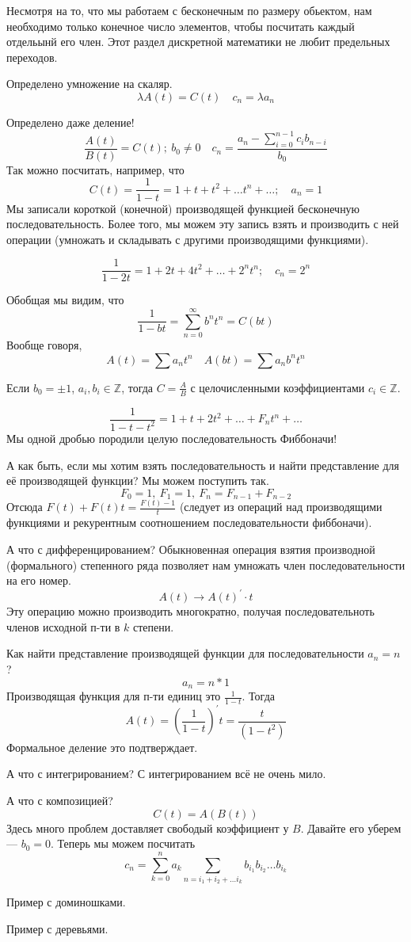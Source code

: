 Несмотря на то, что мы работаем с бесконечным по размеру обьектом, нам необходимо только конечное число элементов, чтобы посчитать каждый отдельынй его член.
Этот раздел дискретной математики не любит предельных переходов.

Определено умножение на скаляр.
\[ \lambda A(t) = C(t) \quad c_n = \lambda a_n\]

Определено даже деление! 
\[ \frac{A(t)}{B(t)} = C(t);\ b_0 \neq 0 \quad c_n = \frac{a_n - \sum_{i=0}^{n-1}c_ib_{n-i}}{b_0} \] 
Так можно посчитать, например, что 
\[C(t) = \frac{1}{1-t} = 1 + t + t^2 + \ldots t^n + \ldots; \quad a_n = 1\]
Мы записали короткой (конечной) производящей функцией бесконечную последовательность. 
Более того, мы можем эту запись взять и производить с ней операции (умножать и складывать с другими производящими функциями).

\[ \frac{1}{1-2t} = 1 + 2t + 4t^2 + \ldots + 2^n t^n; \quad c_n = 2^n \]

Обобщая мы видим, что 
 \[ \frac{1}{1-bt} = \sum_{n=0}^{\infty}b^n t^n = C(bt)\]
 Вообще говоря,
 \[ A(t) = \sum a_nt^n \quad A(bt) = \sum a_n b^n t^n\]

 \begin{remark}
 Если $b_0 = \pm 1$, $a_i, b_i \in \mathbb{Z}$, тогда $C = \frac{A}{B}$ с целочисленными коэффициентами $c_i \in \mathbb{Z}$.
 \end{remark}    

\[ \frac{1}{1-t-t^2} = 1 + t + 2t^2 + \ldots + F_nt^n + \ldots\]
Мы одной дробью породили целую последовательность Фиббоначи!

А как быть, если мы хотим взять последовательность и найти представление для её производящей функции?
Мы можем поступить так.
\[ F_0 = 1,\ F_1 = 1,\ F_n = F_{n-1} + F_{n-2}\]
Отсюда $F(t) + F(t)t = \frac{F(t)-1}{t}$ (следует из операций над производящими функциями и рекурентным соотношением последовательности фиббоначи).

А что с дифференцированием? 
Обыкновенная операция взятия производной (формального) степенного ряда позволяет нам умножать член последовательности на его номер.
\[ A(t) \to A(t)^\prime \cdot t \] 
Эту операцию можно производить многократно, получая последовательноть членов исходной п-ти в $k$ степени.

Как найти представление производящей функции для последовательности $a_n = n$?
\[ a_n = n * 1\]
Производящая функция для п-ти единиц это $\frac{1}{1-t}$.
Тогда 
\[ A(t) = \left( \frac{1}{1-t} \right)^\prime t = \frac{t}{(1-t^2)} \]
Формальное деление это подтверждает.

А что с интегрированием? 
С интегрированием всё не очень мило.

А что с композицией? 
\[C(t) =  A(B(t))\]
Здесь много проблем доставляет свободый коэффициент у $B$.
Давайте его уберем --- $b_0 = 0$.
Теперь мы можем посчитать 
\[ c_n = \sum_{k=0}^{n}a_k \sum_{n = i_1 + i_2 + \ldots i_k}b_{i_1}b_{i_2}\ldots b_{i_k} \]

Пример с доминошками.

Пример с деревьями.
